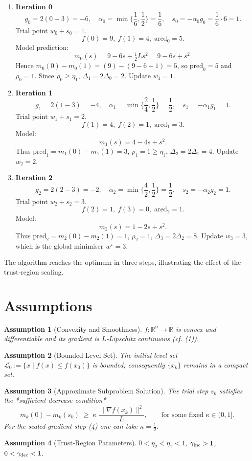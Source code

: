 \documentclass{article}
\newtheorem{assumption}{Assumption}
\begin{document}
\begin{enumerate}[label=\textbf{Iter \arabic*:}]
\item \textbf{Iteration 0}
\[
g_0=2(0-3)=-6,\quad 
\alpha_0=\min\Big\{\frac{1}{6},\frac{1}{2}\Big\}=\frac{1}{6},
\quad s_0=-\alpha_0 g_0=\frac{1}{6}\cdot6=1 .
\]
Trial point $w_0+s_0=1$.  
\[
f(0)=9,\; f(1)=4,\;
\text{ared}_0=5 .
\]
Model prediction:
\[
m_0(s)=9-6s+ \tfrac12 L s^2 =9-6s+s^2 .
\]
Hence $m_0(0)-m_0(1)= (9)-(9-6+1)=5$, so $\text{pred}_0=5$ and $\rho_0=1$.
Since $\rho_0\ge\eta_1$, $\Delta_1=2\Delta_0=2$.
Update $w_1=1$.

\item \textbf{Iteration 1}
\[
g_1=2(1-3)=-4,\quad 
\alpha_1=\min\Big\{\frac{2}{4},\frac{1}{2}\Big\}= \frac{1}{2},
\quad s_1=-\alpha_1 g_1=1 .
\]
Trial point $w_1+s_1=2$.
\[
f(1)=4,\; f(2)=1,\;
\text{ared}_1=3 .
\]
Model:
\[
m_1(s)=4-4s+s^2 .
\]
Thus $\text{pred}_1=m_1(0)-m_1(1)=3$, $\rho_1=1\ge\eta_1$, $\Delta_2=2\Delta_1=4$.
Update $w_2=2$.

\item \textbf{Iteration 2}
\[
g_2=2(2-3)=-2,\quad 
\alpha_2=\min\Big\{\frac{4}{2},\frac{1}{2}\Big\}= \frac{1}{2},
\quad s_2=-\alpha_2 g_2=1 .
\]
Trial point $w_2+s_2=3$.
\[
f(2)=1,\; f(3)=0,\;
\text{ared}_2=1 .
\]
Model:
\[
m_2(s)=1-2s+s^2 .
\]
Thus $\text{pred}_2=m_2(0)-m_2(1)=1$, $\rho_2=1$, $\Delta_3=2\Delta_2=8$.
Update $w_3=3$, which is the global minimiser $w^\star=3$.
\end{enumerate}
The algorithm reaches the optimum in three steps, illustrating the effect of the trust‑region scaling.

\newpage
\section*{Assumptions}
\begin{assumption}[Convexity and Smoothness]\label{as:convex}
$f:\mathbb{R}^n\to\mathbb{R}$ is convex and differentiable and its gradient is $L$‑Lipschitz continuous (cf. (1)).
\end{assumption}
\begin{assumption}[Bounded Level Set]\label{as:bounded}
The initial level set $\mathcal{L}_0:=\{x\mid f(x)\le f(x_0)\}$ is bounded; consequently $\{x_k\}$ remains in a compact set.
\end{assumption}
\begin{assumption}[Approximate Subproblem Solution]\label{as:approx}
The trial step $s_k$ satisfies the *sufficient decrease condition*
\[
m_k(0)-m_k(s_k)\;\ge\;\kappa\;\frac{\|\nabla f(x_k)\|^2}{L},
\qquad\text{for some fixed } \kappa\in(0,1].
\tag{9}
\]
For the scaled gradient step (4) one can take $\kappa=\frac12$.
\end{assumption}
\begin{assumption}[Trust‑Region Parameters]\label{as:params}
$0<\eta_2<\eta_1<1$, $\gamma_{\rm inc}>1$, $0<\gamma_{\rm dec}<1$.
\end{assumption}
\end{document}
